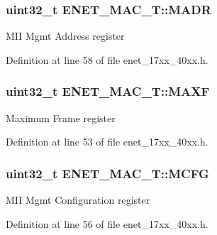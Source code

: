 \subsubsection[{\texorpdfstring{M\+A\+DR}{MADR}}]{ uint32\+\_\+t E\+N\+E\+T\+\_\+\+M\+A\+C\+\_\+\+T\+::\+M\+A\+DR}\hypertarget{structENET__MAC__T_afc17c49a8ba00a4a4db6dc0b87d949b7}{}\label{structENET__MAC__T_afc17c49a8ba00a4a4db6dc0b87d949b7}
M\+II Mgmt Address register 

Definition at line 58 of file enet\+\_\+17xx\+\_\+40xx.\+h.

\subsubsection[{\texorpdfstring{M\+A\+XF}{MAXF}}]{ uint32\+\_\+t E\+N\+E\+T\+\_\+\+M\+A\+C\+\_\+\+T\+::\+M\+A\+XF}\hypertarget{structENET__MAC__T_a5e6d2bc05984b815f245d2ebd3c067a3}{}\label{structENET__MAC__T_a5e6d2bc05984b815f245d2ebd3c067a3}
Maximum Frame register 

Definition at line 53 of file enet\+\_\+17xx\+\_\+40xx.\+h.

\subsubsection[{\texorpdfstring{M\+C\+FG}{MCFG}}]{ uint32\+\_\+t E\+N\+E\+T\+\_\+\+M\+A\+C\+\_\+\+T\+::\+M\+C\+FG}\hypertarget{structENET__MAC__T_a1e733caa47928bbd88205c10549db3b6}{}\label{structENET__MAC__T_a1e733caa47928bbd88205c10549db3b6}
M\+II Mgmt Configuration register 

Definition at line 56 of file enet\+\_\+17xx\+\_\+40xx.\+h.

